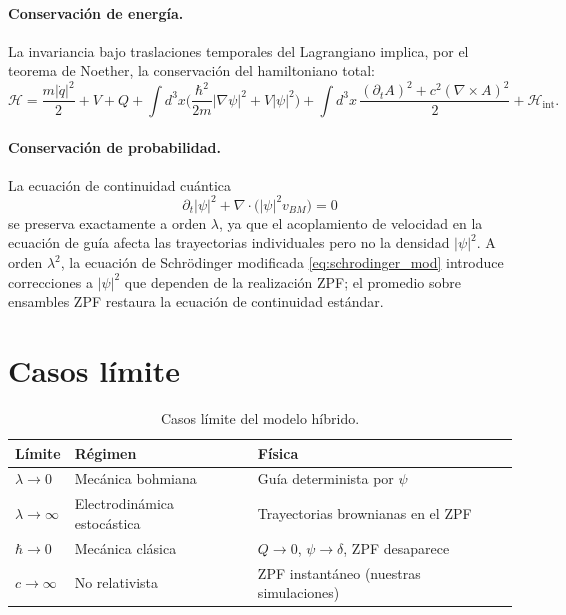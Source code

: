 \documentclass[11pt,a4paper]{article}
\begin{document}
\paragraph{Conservación de energía.} La invariancia bajo traslaciones
temporales del Lagrangiano implica, por el teorema de Noether, la
conservación del hamiltoniano total:
\begin{equation}
\mathcal{H} = \frac{m|\dot{q}|^2}{2} + V + Q
+ \int d^3x\Big(\frac{\hbar^2}{2m}|\nabla\psi|^2 + V|\psi|^2\Big)
+ \int d^3x\,\frac{(\partial_t A)^2 + c^2(\nabla\times A)^2}{2}
+ \mathcal{H}_\text{int}.
\label{eq:hamiltoniano}
\end{equation}

\paragraph{Conservación de probabilidad.} La ecuación de continuidad
cuántica
\begin{equation}
\partial_t|\psi|^2 + \nabla\cdot\big(|\psi|^2 v_{BM}\big) = 0
\label{eq:continuidad_completa}
\end{equation}
se preserva exactamente a orden $\lambda$, ya que el acoplamiento de
velocidad en la ecuación de guía afecta las trayectorias individuales
pero no la densidad $|\psi|^2$. A orden $\lambda^2$, la ecuación de
Schrödinger modificada \eqref{eq:schrodinger_mod} introduce correcciones
a $|\psi|^2$ que dependen de la realización ZPF; el promedio sobre
ensambles ZPF restaura la ecuación de continuidad estándar.

\section{Casos límite}
\label{sec:limites}

\begin{table}[h]
\centering
\caption{Casos límite del modelo híbrido.}
\label{tab:limites}
\begin{tabular}{lll}
\toprule
Límite & Régimen & Física \\
\midrule
$\lambda\to 0$ & Mecánica bohmiana            & Guía determinista por $\psi$ \\
$\lambda\to\infty$ & Electrodinámica estocástica & Trayectorias brownianas en el ZPF \\
$\hbar\to 0$ & Mecánica clásica               & $Q\to 0$, $\psi\to\delta$, ZPF desaparece \\
$c\to\infty$ & No relativista                 & ZPF instantáneo (nuestras simulaciones) \\
\bottomrule
\end{tabular}
\end{table}
\end{document}
